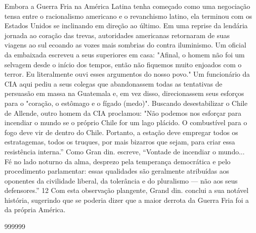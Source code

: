 Embora a Guerra Fria na América Latina tenha começado como uma negociação tensa entre o racionalismo americano e o revanchismo latino, ela terminou com os Estados Unidos se inclinando em direção ao último. Em uma reprise da lendária jornada ao coração das trevas, autoridades americanas retornaram de suas viagens ao sul ecoando as vozes mais sombrias do contra iluminismo. Um oficial da embaixada escreveu a seus superiores em casa: "Afinal, o homem não foi um selvagem desde o início dos tempos, então não fiquemos muito enjoados com o terror. Eu literalmente ouvi esses argumentos do nosso povo." Um funcionário da CIA aqui pediu a seus colegas que abandonassem todas as tentativas de persuasão em massa na Guatemala e, em vez disso, direcionassem seus esforços para o "coração, o estômago e o fígado (medo)". Buscando desestabilizar o Chile de Allende, outro homem da CIA proclamou: "Não podemos nos esforçar para incendiar o mundo se o próprio Chile for um lago plácido. O combustível para o fogo deve vir de dentro do Chile. Portanto, a estação deve empregar todos os estratagemas, todos os truques, por mais bizarros que sejam, para criar essa resistência interna.” Como Gran din. escreve, “Vontade de incendiar o mundo... Fé no lado noturno da alma, desprezo pela temperança democrática e pelo procedimento parlamentar: essas qualidades são geralmente atribuídas aos oponentes da civilidade liberal, da tolerância e do pluralismo — não aos seus defensores.”
 {\color{blue} 12}  
Com esta observação plangente, Grand din. conclui a sua notável história, sugerindo que se poderia dizer que a maior derrota da Guerra Fria foi a da própria América.
 
\par
  
 
999999
